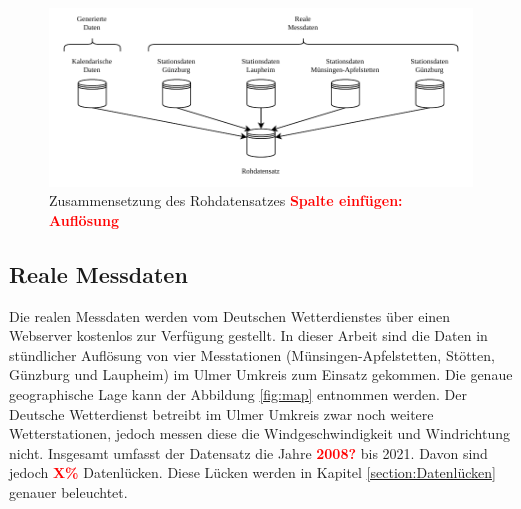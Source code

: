 \documentclass[
12pt, %
toc=listofnumbered, %
toc=chapterentrydotfill, %
numbers=noenddot, %
captions=tableheading, %
bibliography=numbered
]{scrreprt}
\let\Oldsubsection\subsection
\renewcommand{\subsection}{\FloatBarrier\Oldsubsection}
\newcommand{\highlight}[1]{\textbf{\textcolor{red}{#1}}}
\begin{document}
\begin{figure}[tph]
	\begin{center}
		\includegraphics[]{./images/rohdatensatz.pdf}
		\caption{Zusammensetzung des Rohdatensatzes \highlight{Spalte einfügen: Auflösung}}
		\label{fig:rohdatensatz}
	\end{center}
\end{figure}

\subsection{Reale Messdaten}
Die realen Messdaten werden vom Deutschen Wetterdienstes über einen Webserver kostenlos zur Verfügung gestellt. In dieser Arbeit sind die Daten in stündlicher Auflösung von vier Messtationen (Münsingen-Apfelstetten, Stötten, Günzburg und Laupheim) im Ulmer Umkreis zum Einsatz gekommen. Die genaue geographische Lage kann der Abbildung \ref{fig:map} entnommen werden. Der Deutsche Wetterdienst betreibt im Ulmer Umkreis zwar noch weitere Wetterstationen, jedoch messen diese die Windgeschwindigkeit und Windrichtung nicht. Insgesamt umfasst der Datensatz die Jahre \highlight{2008?} bis 2021. Davon sind jedoch \highlight{X\%} Datenlücken. Diese Lücken werden in Kapitel \ref{section:Datenlücken} genauer beleuchtet. 
\end{document}
